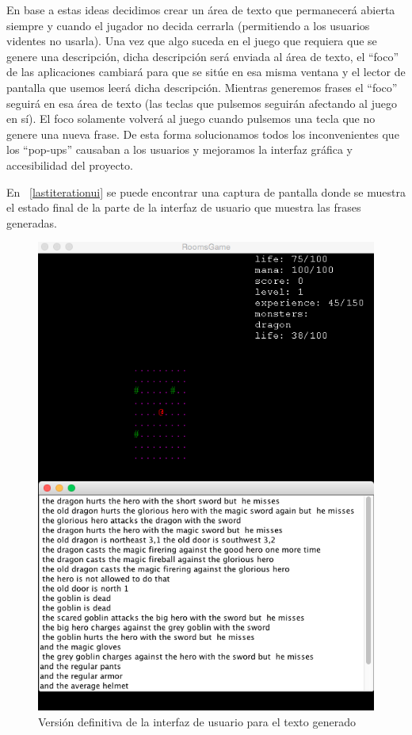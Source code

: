 En base a estas ideas decidimos crear un área de texto que permanecerá abierta siempre y cuando el jugador no decida cerrarla (permitiendo a los usuarios videntes no usarla). Una vez que algo suceda en el juego que requiera que se genere una descripción, dicha descripción será enviada al área de texto, el ``foco'' de las aplicaciones cambiará para que se sitúe en esa misma ventana y el lector de pantalla que usemos leerá dicha descripción. Mientras generemos frases el ``foco'' seguirá en esa área de texto (las teclas que pulsemos seguirán afectando al juego en sí). El foco solamente volverá al juego cuando pulsemos una tecla que no genere una nueva frase.
De esta forma solucionamos todos los inconvenientes que los ``pop-ups'' causaban a los usuarios y mejoramos la interfaz gráfica y accesibilidad del proyecto.

En ~\ref{lastiterationui} se puede encontrar una captura de pantalla donde se muestra el estado final de la parte de la interfaz de usuario que muestra las frases generadas.

\begin{figure}
    \includegraphics[width=\textwidth,height=\textheight,keepaspectratio]{./img/lastiterationui.png}
  \caption{Versión definitiva de la interfaz de usuario para el texto generado}
  \label{fig:lastiterationui}
\end{figure}


